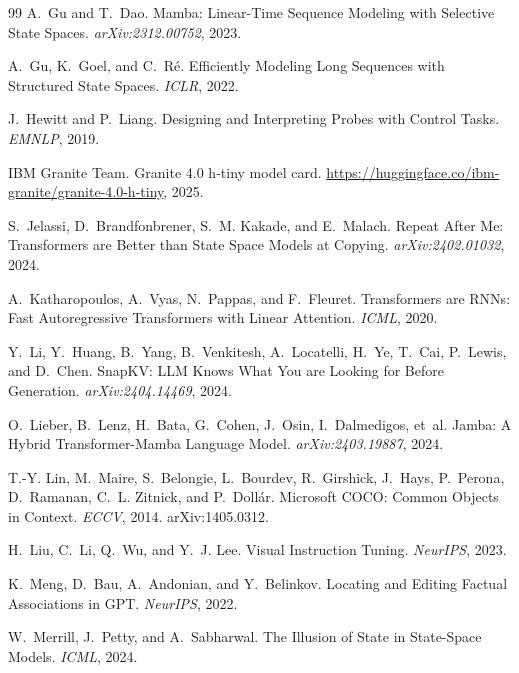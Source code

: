 \documentclass{article}
\begin{document}
\begin{thebibliography}{99}
A.~Gu and T.~Dao.
\newblock Mamba: Linear-Time Sequence Modeling with Selective State Spaces.
\emph{arXiv:2312.00752}, 2023.

A.~Gu, K.~Goel, and C.~R\'e.
\newblock Efficiently Modeling Long Sequences with Structured State Spaces.
\emph{ICLR}, 2022.

J.~Hewitt and P.~Liang.
\newblock Designing and Interpreting Probes with Control Tasks.
\emph{EMNLP}, 2019.

IBM Granite Team.
\newblock Granite 4.0 h-tiny model card.
\newblock \url{https://huggingface.co/ibm-granite/granite-4.0-h-tiny}, 2025.

S.~Jelassi, D.~Brandfonbrener, S.~M. Kakade, and E.~Malach.
\newblock Repeat After Me: Transformers are Better than State Space Models at
Copying. \emph{arXiv:2402.01032}, 2024.

A.~Katharopoulos, A.~Vyas, N.~Pappas, and F.~Fleuret.
\newblock Transformers are RNNs: Fast Autoregressive Transformers with Linear
Attention. \emph{ICML}, 2020.

Y.~Li, Y.~Huang, B.~Yang, B.~Venkitesh, A.~Locatelli, H.~Ye, T.~Cai, P.~Lewis,
and D.~Chen.
\newblock SnapKV: LLM Knows What You are Looking for Before Generation.
\emph{arXiv:2404.14469}, 2024.

O.~Lieber, B.~Lenz, H.~Bata, G.~Cohen, J.~Osin, I.~Dalmedigos, et~al.
\newblock Jamba: A Hybrid Transformer-Mamba Language Model.
\emph{arXiv:2403.19887}, 2024.

T.-Y. Lin, M.~Maire, S.~Belongie, L.~Bourdev, R.~Girshick, J.~Hays, P.~Perona,
D.~Ramanan, C.~L. Zitnick, and P.~Doll\'ar.
\newblock Microsoft COCO: Common Objects in Context.
\newblock \emph{ECCV}, 2014. arXiv:1405.0312.

H.~Liu, C.~Li, Q.~Wu, and Y.~J. Lee.
\newblock Visual Instruction Tuning. \emph{NeurIPS}, 2023.

K.~Meng, D.~Bau, A.~Andonian, and Y.~Belinkov.
\newblock Locating and Editing Factual Associations in GPT.
\emph{NeurIPS}, 2022.

W.~Merrill, J.~Petty, and A.~Sabharwal.
\newblock The Illusion of State in State-Space Models. \emph{ICML}, 2024.


\end{thebibliography}
\end{document}
